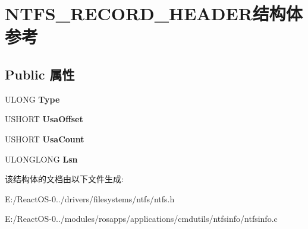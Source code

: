 \hypertarget{struct_n_t_f_s___r_e_c_o_r_d___h_e_a_d_e_r}{}\section{N\+T\+F\+S\+\_\+\+R\+E\+C\+O\+R\+D\+\_\+\+H\+E\+A\+D\+E\+R结构体 参考}
\label{struct_n_t_f_s___r_e_c_o_r_d___h_e_a_d_e_r}
\subsection*{Public 属性}
\begin{DoxyCompactItemize}
\item 
\mbox{\label{struct_n_t_f_s___r_e_c_o_r_d___h_e_a_d_e_r_aab3b2abc43490c0f93d2a691da0e43b8}} 
U\+L\+O\+NG {\bfseries Type}
\item 
\mbox{\label{struct_n_t_f_s___r_e_c_o_r_d___h_e_a_d_e_r_a6b3c8da865365dbc89da4877460adb8e}} 
U\+S\+H\+O\+RT {\bfseries Usa\+Offset}
\item 
\mbox{\label{struct_n_t_f_s___r_e_c_o_r_d___h_e_a_d_e_r_a08e17df6cf81f799b0879885bc08511e}} 
U\+S\+H\+O\+RT {\bfseries Usa\+Count}
\item 
\mbox{\label{struct_n_t_f_s___r_e_c_o_r_d___h_e_a_d_e_r_afe4626451b9c62a84a5afc8f18bb9dee}} 
U\+L\+O\+N\+G\+L\+O\+NG {\bfseries Lsn}
\end{DoxyCompactItemize}


该结构体的文档由以下文件生成\+:\begin{DoxyCompactItemize}
\item 
E\+:/\+React\+O\+S-\/0../drivers/filesystems/ntfs/ntfs.\+h\item 
E\+:/\+React\+O\+S-\/0../modules/rosapps/applications/cmdutils/ntfsinfo/ntfsinfo.\+c\end{DoxyCompactItemize}

